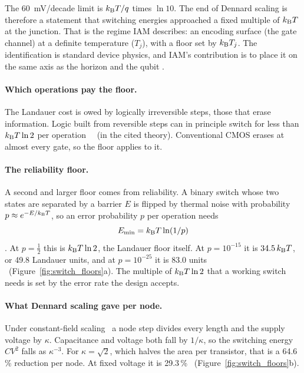 \begin{keybox}[title={The Dennard wall is a Boltzmann wall}]
The 60~mV/decade limit is $k_{\mathrm B} T/q$ times $\ln10$. The end of Dennard scaling is therefore
a statement that switching energies approached a fixed multiple of $k_{\mathrm B} T$ at the junction.
That is the regime IAM describes: an encoding surface (the gate channel) at a definite
temperature ($T_j$), with a floor set by $k_{\mathrm B} T_j$. The identification is standard device
physics, and IAM's contribution is to place it on the same axis as the horizon and the qubit \interp.
\end{keybox}

\paragraph{Which operations pay the floor.} The Landauer cost is owed by logically irreversible steps, those that
erase information. Logic built from reversible steps can in principle switch for less than $k_{\mathrm B} T\ln2$ per
operation~\cite{Bennett1973,Bennett1982} \derived\ (in the cited theory). Conventional CMOS erases at almost every gate, so the floor applies to it.

\paragraph{The reliability floor.} A second and larger floor comes from reliability. A binary switch whose two states
are separated by a barrier $E$ is flipped by thermal noise with probability $p\approx e^{-E/k_{\mathrm B} T}$, so an error
probability $p$ per operation needs
\begin{equation}
 E_{\min}=k_{\mathrm B} T\ln(1/p)
 \label{eq:reliableswitch}
\end{equation}
\cite{Zhirnov2003}. At $p=\tfrac12$ this is $k_{\mathrm B} T\ln2$, the Landauer floor itself. At $p=10^{-15}$ it is
$34.5\,k_{\mathrm B} T$, or 49.8 Landauer units, and at $p=10^{-25}$ it is 83.0 units \calc\ (Figure~\ref{fig:switch_floors}a).
The multiple of $k_{\mathrm B} T\ln2$ that a working switch needs is set by the error rate the design accepts.

\paragraph{What Dennard scaling gave per node.} Under constant-field scaling~\cite{Dennard1974} a node step divides
every length and the supply voltage by $\kappa$. Capacitance and voltage both fall by $1/\kappa$, so the switching
energy $CV^2$ falls as $\kappa^{-3}$. For $\kappa=\sqrt2$, which halves the area per transistor, that is a 64.6\,\%
reduction per node. At fixed voltage it is 29.3\,\% \derived\ (Figure~\ref{fig:switch_floors}b).

